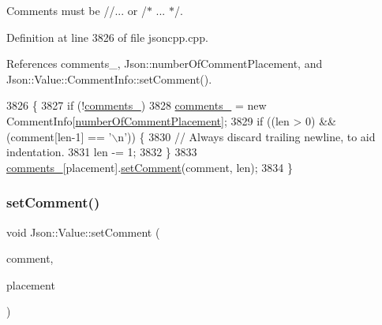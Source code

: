 Comments must be //... or /$\ast$ ... $\ast$/. 



Definition at line 3826 of file jsoncpp.\+cpp.



References comments\+\_\+, Json\+::number\+Of\+Comment\+Placement, and Json\+::\+Value\+::\+Comment\+Info\+::set\+Comment().


\begin{DoxyCode}
3826                                                                                   \{
3827   \textcolor{keywordflow}{if} (!\hyperlink{class_json_1_1_value_a2016564cabc7a29208e97bd0b782a4e4}{comments\_})
3828     \hyperlink{class_json_1_1_value_a2016564cabc7a29208e97bd0b782a4e4}{comments\_} = \textcolor{keyword}{new} CommentInfo[\hyperlink{namespace_json_a4fc417c23905b2ae9e2c47d197a45351abcbd3eb00417335e094e4a03379659b5}{numberOfCommentPlacement}];
3829   \textcolor{keywordflow}{if} ((len > 0) && (comment[len-1] == \textcolor{charliteral}{'\(\backslash\)n'})) \{
3830     \textcolor{comment}{// Always discard trailing newline, to aid indentation.}
3831     len -= 1;
3832   \}
3833   \hyperlink{class_json_1_1_value_a2016564cabc7a29208e97bd0b782a4e4}{comments\_}[placement].\hyperlink{struct_json_1_1_value_1_1_comment_info_a4d01c2cd8c07995969c5d636dfd4fa8c}{setComment}(comment, len);
3834 \}
\end{DoxyCode}
\mbox{\label{class_json_1_1_value_a2c5d13a5f45eb77e912008778e65b27f}} 
\subsubsection{\texorpdfstring{set\+Comment()}{setComment()}\hspace{0.1cm}{\footnotesize\ttfamily [3/3]}}
{\footnotesize\ttfamily void Json\+::\+Value\+::set\+Comment (\begin{DoxyParamCaption}\item[{const \hyperlink{json_8h_a1e723f95759de062585bc4a8fd3fa4be}{J\+S\+O\+N\+C\+P\+P\+\_\+\+S\+T\+R\+I\+NG} \&}]{comment,  }\item[{\hyperlink{namespace_json_a4fc417c23905b2ae9e2c47d197a45351}{Comment\+Placement}}]{placement }\end{DoxyParamCaption})}



